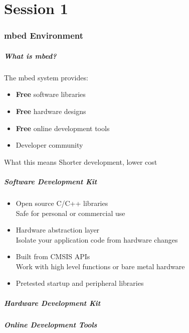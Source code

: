 \part{Session 1}

\section{mbed Environment}
\begin{frame}
	\frametitle{What is mbed?}
	The mbed system provides:
	\begin{itemize}
		\item \textbf{Free} software libraries
		\item \textbf{Free} hardware designs
		\item \textbf{Free} online development tools
		\item Developer community
	\end{itemize}
	\begin{block}{What this means}
		Shorter development, lower cost
	\end{block}
\end{frame}

\begin{frame}
	\frametitle{Software Development Kit}
	\begin{itemize}
		\item Open source C/C++ libraries\\
			Safe for personal or commercial use
		\item Hardware abstraction layer\\
			Isolate your application code from hardware changes
		\item Built from CMSIS APIs\\
			Work with high level functions or bare metal hardware
		\item Pretested startup and peripheral libraries
	\end{itemize}
\end{frame}

\begin{frame}
	\frametitle{Hardware Development Kit}
\end{frame}

\begin{frame}[t]
	\frametitle{Online Development Tools}
\end{frame}

